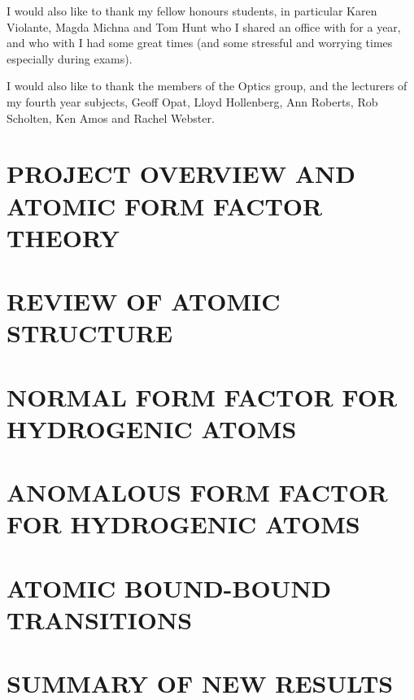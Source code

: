 \documentclass[a4paper,titlepage]{sfreport}
\begin{document}
    I would also like to thank my fellow honours students, in particular
    Karen Violante, Magda Michna and Tom Hunt who I shared an office with for a
    year, and who with I had some great times (and some stressful and worrying times
    especially during exams).

    I would also like to thank the members of the Optics group, and the
    lecturers of my fourth year subjects, Geoff Opat, Lloyd Hollenberg, Ann
    Roberts, Rob Scholten, Ken Amos and Rachel Webster.

    \tableofcontents
    \listoffigures

    \chapter{PROJECT OVERVIEW AND ATOMIC FORM FACTOR THEORY}
        
        

    \chapter{REVIEW OF ATOMIC STRUCTURE}
        

    \chapter{NORMAL FORM FACTOR FOR HYDROGENIC ATOMS}
        
        
        

    \chapter{ANOMALOUS FORM FACTOR FOR HYDROGENIC ATOMS}
        

    \chapter{ATOMIC BOUND-BOUND TRANSITIONS}
        

    \chapter{SUMMARY OF NEW RESULTS}
        

    
    
\end{document}
